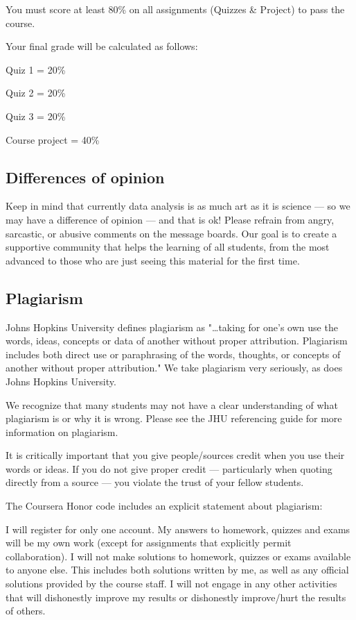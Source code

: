 You must score at least 80\% on all assignments (Quizzes \& Project) to pass the course.

Your final grade will be calculated as follows:

\begin{nitemize}
\item    Quiz 1 = 20\%
\item    Quiz 2 = 20\%
\item    Quiz 3 = 20\%
\item    Course project = 40\%
\end{nitemize}


\subsection*{Differences of opinion}

Keep in mind that currently data analysis is as much art as it is science --- so we may have a difference of opinion --- and that is ok! Please refrain from angry, sarcastic, or abusive comments on the message boards. Our goal is to create a supportive community that helps the learning of all students, from the most advanced to those who are just seeing this material for the first time.


\subsection*{Plagiarism}

Johns Hopkins University defines plagiarism as "\ldots taking for one's own use the words, ideas, concepts or data of another without proper attribution. Plagiarism includes both direct use or paraphrasing of the words, thoughts, or concepts of another without proper attribution." We take plagiarism very seriously, as does Johns Hopkins University.

We recognize that many students may not have a clear understanding of what plagiarism is or why it is wrong. Please see the JHU referencing guide for more information on plagiarism.

It is critically important that you give people/sources credit when you use their words or ideas. If you do not give proper credit --- particularly when quoting directly from a source --- you violate the trust of your fellow students.

The Coursera Honor code includes an explicit statement about plagiarism:

I will register for only one account. My answers to homework, quizzes and exams will be my own work (except for assignments that explicitly permit collaboration). I will not make solutions to homework, quizzes or exams available to anyone else. This includes both solutions written by me, as well as any official solutions provided by the course staff. I will not engage in any other activities that will dishonestly improve my results or dishonestly improve/hurt the results of others.


